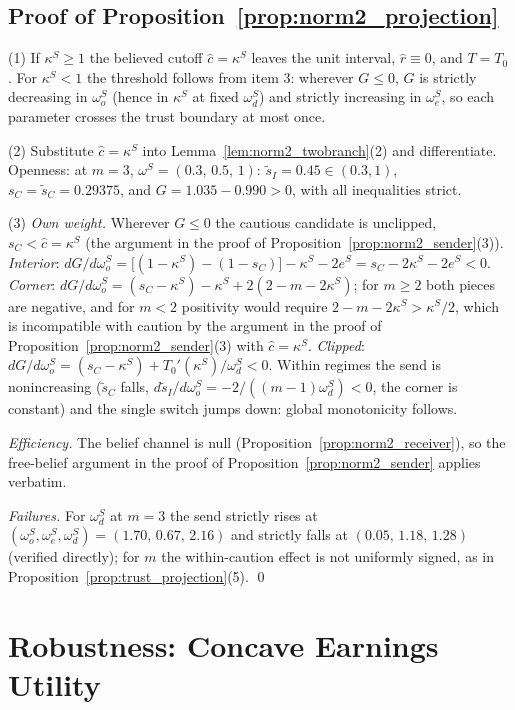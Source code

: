 \documentclass[11pt]{article}
\theoremstyle{plain}
\theoremstyle{remark}
\begin{document}
\subsection*{Proof of Proposition~\ref{prop:norm2_projection}}

(1) If $\kappa^S\ge1$ the believed cutoff $\hat c=\kappa^S$ leaves the unit interval, $\hat r\equiv0$, and $T=T_0$.  For $\kappa^S<1$ the threshold follows from item 3: wherever $G\le0$, $G$ is strictly decreasing in $\omega_o^S$ (hence in $\kappa^S$ at fixed $\omega_d^S$) and strictly increasing in $\omega_e^S$, so each parameter crosses the trust boundary at most once.

(2) Substitute $\hat c=\kappa^S$ into Lemma~\ref{lem:norm2_twobranch}(2) and differentiate.  Openness: at $m=3$, $\omega^S=(0.3,\,0.5,\,1)$: $\tilde s_I=0.45\in(0.3,1)$, $s_C=\tilde s_C=0.29375$, and $G=1.035-0.990>0$, with all inequalities strict.

(3) \emph{Own weight.}  Wherever $G\le0$ the cautious candidate is unclipped, $s_C<\hat c=\kappa^S$ (the argument in the proof of Proposition~\ref{prop:norm2_sender}(3)).  \emph{Interior}: $dG/d\omega_o^S=\big[(1-\kappa^S)-(1-s_C)\big]-\kappa^S-2e^S=s_C-2\kappa^S-2e^S<0$.  \emph{Corner}: $dG/d\omega_o^S=(s_C-\kappa^S)-\kappa^S+2(2-m-2\kappa^S)$; for $m\ge2$ both pieces are negative, and for $m<2$ positivity would require $2-m-2\kappa^S>\kappa^S/2$, which is incompatible with caution by the argument in the proof of Proposition~\ref{prop:norm2_sender}(3) with $\hat c=\kappa^S$.  \emph{Clipped}: $dG/d\omega_o^S=(s_C-\kappa^S)+T_0'(\kappa^S)/\omega_d^S<0$.  Within regimes the send is nonincreasing ($\tilde s_C$ falls, $d\tilde s_I/d\omega_o^S=-2/((m-1)\omega_d^S)<0$, the corner is constant) and the single switch jumps down: global monotonicity follows.

\emph{Efficiency.}  The belief channel is null (Proposition~\ref{prop:norm2_receiver}), so the free-belief argument in the proof of Proposition~\ref{prop:norm2_sender} applies verbatim.

\emph{Failures.}  For $\omega_d^S$ at $m=3$ the send strictly rises at $(\omega_o^S,\omega_e^S,\omega_d^S)=(1.70,\,0.67,\,2.16)$ and strictly falls at $(0.05,\,1.18,\,1.28)$ (verified directly); for $m$ the within-caution effect is not uniformly signed, as in Proposition~\ref{prop:trust_projection}(5).
\qed

\section{Robustness: Concave Earnings Utility}
\label{sec:robust}
\end{document}
